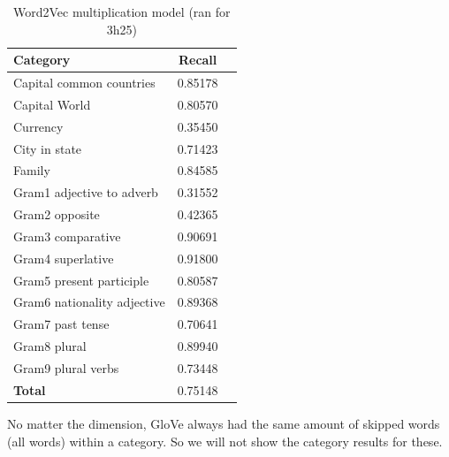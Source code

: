 \begin{center}
    \begin{table}[h!]
        \begin{tabular}{| l | c | r}
        	\hline
        	\textbf{Category} &    \textbf{Recall}\\ \hline
        	Capital common countries 	& 0.85178 \\
        	Capital World 				& 0.80570 \\
        	Currency					& 0.35450 \\
        	City in state				& 0.71423 \\
        	Family 						& 0.84585 \\
        	Gram1 adjective to adverb 	& 0.31552 \\
        	Gram2 opposite 				& 0.42365 \\
        	Gram3 comparative 			& 0.90691 \\
        	Gram4 superlative 			& 0.91800 \\
        	Gram5 present participle	& 0.80587 \\
        	Gram6 nationality adjective & 0.89368 \\
        	Gram7 past tense 			& 0.70641 \\
        	Gram8 plural 				& 0.89940 \\
        	Gram9 plural verbs 			& 0.73448 \\
        	\textbf{Total}				& 0.75148 \\ \hline
        \end{tabular}
    \caption{Word2Vec multiplication model (ran for 3h25)}
    \label{table:word2vec_multiplication}
    \end{table}
\end{center}

No matter the dimension, GloVe always had the same amount of skipped words (all words) within a category. So we will not show the category results for these.

